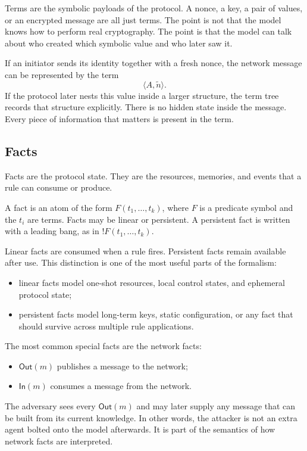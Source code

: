 Terms are the symbolic payloads of the protocol.  A nonce, a key, a pair of
values, or an encrypted message are all just terms.  The point is not that
the model knows how to perform real cryptography.  The point is that the
model can talk about who created which symbolic value and who later saw it.

\begin{example}
If an initiator sends its identity together with a fresh nonce, the network
message can be represented by the term
\[
  \langle A,\tilde n\rangle.
\]
If the protocol later nests this value inside a larger structure, the term
tree records that structure explicitly.  There is no hidden state inside the
message.  Every piece of information that matters is present in the term.
\end{example}

\subsection{Facts}

Facts are the protocol state.  They are the resources, memories, and events
that a rule can consume or produce.

\begin{definition}[Facts]
\label{def:tamarin-facts}
A fact is an atom of the form $F(t_1,\dots,t_k)$, where $F$ is a predicate
symbol and the $t_i$ are terms.  Facts may be linear or persistent.  A
persistent fact is written with a leading bang, as in $!F(t_1,\dots,t_k)$.
\end{definition}

Linear facts are consumed when a rule fires.  Persistent facts remain
available after use.  This distinction is one of the most useful parts of the
formalism:
\begin{itemize}
  \item linear facts model one-shot resources, local control states, and
        ephemeral protocol state;
  \item persistent facts model long-term keys, static configuration, or any
        fact that should survive across multiple rule applications.
\end{itemize}

The most common special facts are the network facts:
\begin{itemize}
  \item $\mathsf{Out}(m)$ publishes a message to the network;
  \item $\mathsf{In}(m)$ consumes a message from the network.
\end{itemize}
The adversary sees every $\mathsf{Out}(m)$ and may later supply any message
that can be built from its current knowledge.  In other words, the attacker is
not an extra agent bolted onto the model afterwards.  It is part of the
semantics of how network facts are interpreted.

